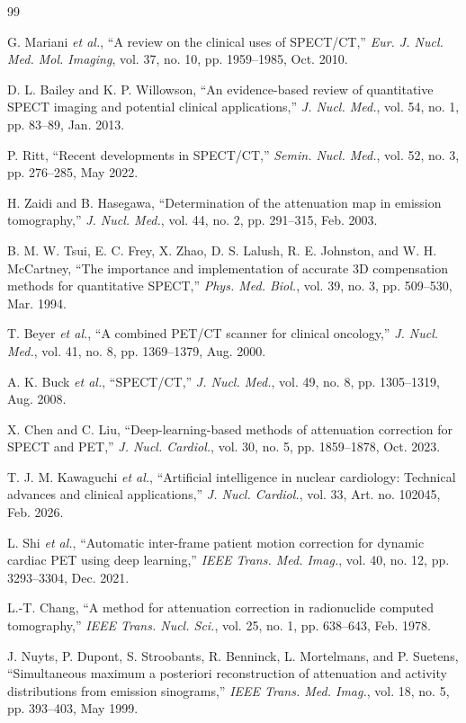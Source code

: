 \documentclass[11pt, a4paper]{article}
\begin{document}
\begin{thebibliography}{99}

 G. Mariani \textit{et al.}, ``A review on the clinical uses of SPECT/CT,'' \textit{Eur. J. Nucl. Med. Mol. Imaging}, vol. 37, no. 10, pp. 1959--1985, Oct. 2010.

 D. L. Bailey and K. P. Willowson, ``An evidence-based review of quantitative SPECT imaging and potential clinical applications,'' \textit{J. Nucl. Med.}, vol. 54, no. 1, pp. 83--89, Jan. 2013.

 P. Ritt, ``Recent developments in SPECT/CT,'' \textit{Semin. Nucl. Med.}, vol. 52, no. 3, pp. 276--285, May 2022.

 H. Zaidi and B. Hasegawa, ``Determination of the attenuation map in emission tomography,'' \textit{J. Nucl. Med.}, vol. 44, no. 2, pp. 291--315, Feb. 2003.

 B. M. W. Tsui, E. C. Frey, X. Zhao, D. S. Lalush, R. E. Johnston, and W. H. McCartney, ``The importance and implementation of accurate 3D compensation methods for quantitative SPECT,'' \textit{Phys. Med. Biol.}, vol. 39, no. 3, pp. 509--530, Mar. 1994.

 T. Beyer \textit{et al.}, ``A combined PET/CT scanner for clinical oncology,'' \textit{J. Nucl. Med.}, vol. 41, no. 8, pp. 1369--1379, Aug. 2000.

 A. K. Buck \textit{et al.}, ``SPECT/CT,'' \textit{J. Nucl. Med.}, vol. 49, no. 8, pp. 1305--1319, Aug. 2008.

 X. Chen and C. Liu, ``Deep-learning-based methods of attenuation correction for SPECT and PET,'' \textit{J. Nucl. Cardiol.}, vol. 30, no. 5, pp. 1859--1878, Oct. 2023.

 T. J. M. Kawaguchi \textit{et al.}, ``Artificial intelligence in nuclear cardiology: Technical advances and clinical applications,'' \textit{J. Nucl. Cardiol.}, vol. 33, Art. no. 102045, Feb. 2026.

 L. Shi \textit{et al.}, ``Automatic inter-frame patient motion correction for dynamic cardiac PET using deep learning,'' \textit{IEEE Trans. Med. Imag.}, vol. 40, no. 12, pp. 3293--3304, Dec. 2021.

 L.-T. Chang, ``A method for attenuation correction in radionuclide computed tomography,'' \textit{IEEE Trans. Nucl. Sci.}, vol. 25, no. 1, pp. 638--643, Feb. 1978.

 J. Nuyts, P. Dupont, S. Stroobants, R. Benninck, L. Mortelmans, and P. Suetens, ``Simultaneous maximum a posteriori reconstruction of attenuation and activity distributions from emission sinograms,'' \textit{IEEE Trans. Med. Imag.}, vol. 18, no. 5, pp. 393--403, May 1999.


\end{thebibliography}
\end{document}
